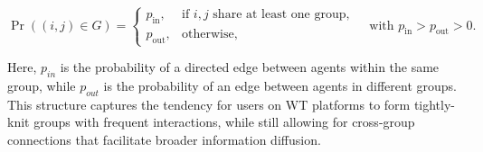 \begin{equation}
\Pr((i,j)\in G) =
\begin{cases}
p_{\text{in}}, & \text{if } i,j \text{ share at least one group}, \\
p_{\text{out}}, & \text{otherwise},
\end{cases}
\quad \text{with } p_{\text{in}} > p_{\text{out}} > 0.
\end{equation}

Here, $p_{in}$ is the probability of a directed edge between agents within the same group, while $p_{out}$ is the probability of an edge between agents in different groups. This structure captures the tendency for users on WT platforms to form tightly-knit groups with frequent interactions, while still allowing for cross-group connections that facilitate broader information diffusion.
